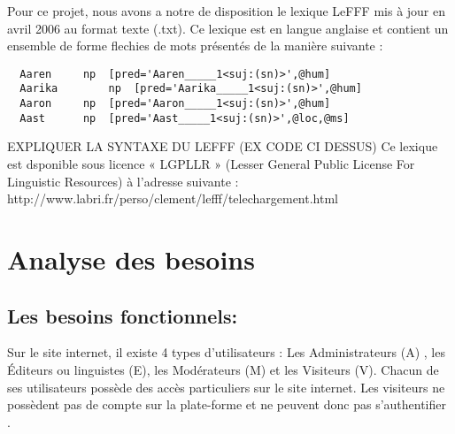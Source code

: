\documentclass[12pt,a4paper]{article}
\begin{document}
Pour ce projet, nous avons a notre de disposition le lexique LeFFF mis à jour en avril 2006 au format texte (.txt).
Ce lexique est en langue anglaise et contient un ensemble de forme flechies de mots présentés de la manière suivante :
\begin{verbatim}
  Aaren		np	[pred='Aaren_____1<suj:(sn)>',@hum]
  Aarika		np	[pred='Aarika_____1<suj:(sn)>',@hum]
  Aaron		np	[pred='Aaron_____1<suj:(sn)>',@hum]
  Aast		np	[pred='Aast_____1<suj:(sn)>',@loc,@ms]
\end{verbatim}

EXPLIQUER LA SYNTAXE DU LEFFF (EX CODE CI DESSUS)
Ce lexique est dsponible sous licence « LGPLLR » (Lesser General Public License For Linguistic Resources) à l'adresse suivante : http://www.labri.fr/perso/clement/lefff/telechargement.html
\section{Analyse des besoins}

\subsection{Les besoins fonctionnels:}

Sur le site internet, il existe 4 types d’utilisateurs : Les Administrateurs (A) , les Éditeurs ou linguistes (E), les Modérateurs (M) et les Visiteurs (V).
Chacun de ses utilisateurs possède des accès particuliers sur le site internet.
Les visiteurs ne possèdent pas de compte sur la plate-forme et ne peuvent donc pas s'authentifier . 
\end{document}
